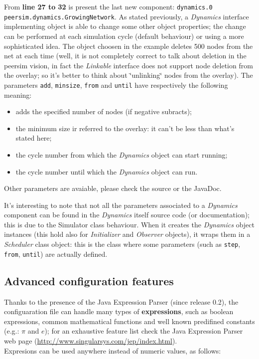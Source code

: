 \documentclass[a4paper,11pt]{article}
\begin{document}
From \textbf{line 27 to 32} is present the last new component: 
\texttt{dynamics.0
peersim.dynamics.GrowingNetwork}. As stated previously, a \emph{Dynamics}
interface implementing object is able to change some other object
properties; the change can be performed at each simulation cycle (default
behaviour) or using a more sophisticated idea. The object choosen
in the example deletes 500 nodes from the net at each time (well,
it is not completely correct to talk about deletion in the peersim
vision, in fact the \emph{Linkable} interface does not support node
deletion from the overlay; so it's better to think about \char`\"{}unlinking\char`\"{}
nodes from the overlay). The parameters \texttt{add}, \texttt{minsize},
\texttt{from} and \texttt{until} have respectively the following meaning:

\begin{itemize}
\item adds the specified number of nodes (if negative subracts);
\item the minimum size ir referred to the overlay: it can't be less than
what's stated here;
\item the cycle number from which the \emph{Dynamics} object can start running;
\item the cycle number until which the \emph{Dynamics} object can run.
\end{itemize}
Other parameters are avaiable, please check the source or the JavaDoc.

It's interesting to note that not all the parameters associated to
a \emph{Dynamics} component can be found in the \emph{Dynamics} itself
source code (or documentation); this is due to the Simulator class
behaviour. When it creates the \emph{Dynamics} object instances (this
hold also for \emph{Initializer} and \emph{Observer} objects), it
wraps them in a \emph{Scheduler} class object: this is the class where
some parameters (such as \texttt{step}, \texttt{from}, \texttt{until})
are actually defined.

\subsection{Advanced configuration features}

Thanks to the presence of the Java Expression Parser (since release
0.2), the configuaration
file can handle many types of \textbf{expressions}, such as boolean 
expressions, 
common
mathematical functions and well known predifined constants (e.g.: $\pi$ 
and
$e$); for an exhaustive feature list check the Java Expression Parser
web page (\url{http://www.singularsys.com/jep/index.html}).\\
Expresions can be used anywhere instead of numeric values, as follows:
\end{document}
